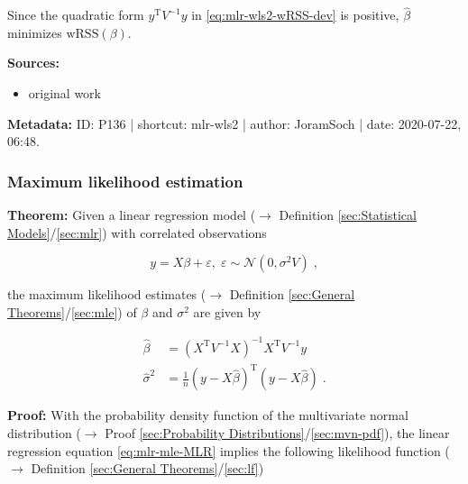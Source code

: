 \documentclass[a4paper,12pt,twoside]{book}
\begin{document}
Since the quadratic form $y^\mathrm{T} V^{-1} y$ in \eqref{eq:mlr-wls2-wRSS-dev} is positive, $\hat{\beta}$ minimizes $\mathrm{wRSS}(\beta)$.


\vspace{1em}
\textbf{Sources:}
\begin{itemize}
\item original work\end{itemize}


\vspace{1em}
\textbf{Metadata:} ID: P136 | shortcut: mlr-wls2 | author: JoramSoch | date: 2020-07-22, 06:48.
\vspace{1em}



\subsubsection[\textbf{Maximum likelihood estimation}]{Maximum likelihood estimation} \label{sec:mlr-mle}
\setcounter{equation}{0}

\textbf{Theorem:} Given a linear regression model ($\rightarrow$ Definition \ref{sec:Statistical Models}/\ref{sec:mlr}) with correlated observations

\begin{equation} \label{eq:mlr-mle-MLR}
y = X\beta + \varepsilon, \; \varepsilon \sim \mathcal{N}(0, \sigma^2 V) \; ,
\end{equation}

the maximum likelihood estimates ($\rightarrow$ Definition \ref{sec:General Theorems}/\ref{sec:mle}) of $\beta$ and $\sigma^2$ are given  by

\begin{equation} \label{eq:mlr-mle-MLE-MLE}
\begin{split}
\hat{\beta} &= (X^\mathrm{T} V^{-1} X)^{-1} X^\mathrm{T} V^{-1} y \\
\hat{\sigma}^2 &= \frac{1}{n} (y-X\hat{\beta})^\mathrm{T} (y-X\hat{\beta}) \; .
\end{split}
\end{equation}


\vspace{1em}
\textbf{Proof:} With the probability density function of the multivariate normal distribution ($\rightarrow$ Proof \ref{sec:Probability Distributions}/\ref{sec:mvn-pdf}), the linear regression equation \eqref{eq:mlr-mle-MLR} implies the following likelihood function ($\rightarrow$ Definition \ref{sec:General Theorems}/\ref{sec:lf})
\end{document}
